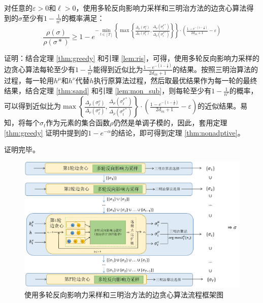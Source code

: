 \begin{theorem}
\label{thm:nonadptive}
对任意的$\varepsilon>0$和$\ell > 0$，使用多轮反向影响力采样和三明治方法的边贪心算法得到的$\sigma$至少有$1-\frac{1}{n^{\ell}}$的概率满足：
\begin{equation}
\frac{\rho(\sigma)}{\rho(\sigma*)} \ge 1-e^{-\min_{t \in [T]}\left\{\max\left\{\frac{\Delta_\rho(\sigma_t^\nu)}{\Delta_\nu(\sigma_t^\nu)},\frac{\Delta_\mu(\sigma_t^{\rho*})}{\Delta_\rho(\sigma_t^{\rho*})} \right\}\right\}\cdot\left(\frac{1-e^{-(1-\frac{1}{k})}}{2d_{in}+1}-\varepsilon\right)}
\end{equation}
\end{theorem}

\noindent 证明：结合定理 \ref{thm:greedy} 和引理 \ref{lem:ris}，可得，使用多轮反向影响力采样的边贪心算法每轮至少有$1-\frac{1}{n^{\ell}}$能得到近似比为$\frac{1-e^{-(1-\frac{1}{k})}}{2d_{in}+1}$的结果。按照三明治算法的过程，每一轮用$h^\mu$和$h^\nu$代替$h$执行原算法过程，然后取最优结果作为每一轮的最终结果，结合定理 \ref{thm:sand} 和引理 \ref{lem:mon_sub}，则每轮至少有$1-\frac{1}{n^{\ell}}$的概率，可以得到近似比为$\max\left\{\frac{\Delta_\rho(\sigma_t^\nu)}{\Delta_\nu(\sigma_t^\nu)},\frac{\Delta_\mu(\sigma_t^{\rho*})}{\Delta_\rho(\sigma_t^{\rho*})} \right\}\cdot\left(\frac{1-e^{-(1-\frac{1}{k})}}{2d_{in}+1}-\varepsilon\right)$的近似结果。易知，将每个$\sigma_t$作为元素的集合函数$\rho$仍然是单调子模的，因此，套用定理 \ref{thm:greedy} 证明中提到的$1-e^{-\alpha}$的结论，即可得到定理 \ref{thm:nonadptive}。

\noindent 证明完毕。

\begin{figure}[th]
    \centering
    \includegraphics[width=.89\linewidth]{figure/sasim/frame}
    \caption{使用多轮反向影响力采样和三明治方法的边贪心算法流程框架图}
    \label{fig:sasim_frame}
\end{figure}

